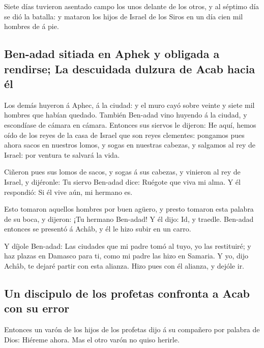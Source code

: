  Siete días tuvieron asentado campo los unos delante de los
otros, y al séptimo día se dió la batalla: y mataron los hijos de Israel
de los Siros en un día cien mil hombres de á pie.

\hypertarget{ben-adad-sitiada-en-aphek-y-obligada-a-rendirse-la-descuidada-dulzura-de-acab-hacia-uxe9l}{%
\subsection{Ben-adad sitiada en Aphek y obligada a rendirse; La
descuidada dulzura de Acab hacia
él}\label{ben-adad-sitiada-en-aphek-y-obligada-a-rendirse-la-descuidada-dulzura-de-acab-hacia-uxe9l}}

 Los demás huyeron á Aphec, á la ciudad: y el muro cayó
sobre veinte y siete mil hombres que habían quedado. También Ben-adad
vino huyendo á la ciudad, y escondíase de cámara en cámara.
 Entonces sus siervos le dijeron: He aquí, hemos oído de
los reyes de la casa de Israel que son reyes clementes: pongamos pues
ahora sacos en nuestros lomos, y sogas en nuestras cabezas, y salgamos
al rey de Israel: por ventura te salvará la vida.

 Ciñeron pues sus lomos de sacos, y sogas á sus cabezas, y
vinieron al rey de Israel, y dijéronle: Tu siervo Ben-adad dice: Ruégote
que viva mi alma. Y él respondió: Si él vive aún, mi hermano es.

 Esto tomaron aquellos hombres por buen agüero, y presto
tomaron esta palabra de su boca, y dijeron: ¡Tu hermano Ben-adad! Y él
dijo: Id, y traedle. Ben-adad entonces se presentó á Achâb, y él le hizo
subir en un carro.

 Y díjole Ben-adad: Las ciudades que mi padre tomó al tuyo,
yo las restituiré; y haz plazas en Damasco para ti, como mi padre las
hizo en Samaria. Y yo, dijo Achâb, te dejaré partir con esta alianza.
Hizo pues con él alianza, y dejóle ir.

\hypertarget{un-discipulo-de-los-profetas-confronta-a-acab-con-su-error}{%
\subsection{Un discipulo de los profetas confronta a Acab con su
error}\label{un-discipulo-de-los-profetas-confronta-a-acab-con-su-error}}

 Entonces un varón de los hijos de los profetas dijo á su
compañero por palabra de Dios: Hiéreme ahora. Mas el otro varón no quiso
herirle.

